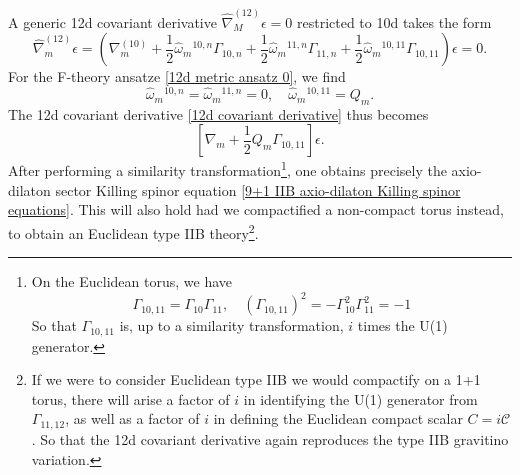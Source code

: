 {\color{orange}
    A generic 12d covariant derivative $\hat{\nabla}^{(12)}_M\epsilon = 0$ restricted to 10d takes the form
\begin{equation}
\hat{\nabla}^{(12)}_m\epsilon
=\left(
\nabla^{(10)}_m
+\frac{1}{2}\hat{\omega}_m{}^{10,n}\Gamma_{10,n}
+\frac{1}{2}\hat{\omega}_m{}^{11,n}\Gamma_{11,n}
+\frac{1}{2}\hat{\omega}_m{}^{10,11}\Gamma_{10,11}\right)\epsilon = 0.
\label{12d covariant derivative}
\end{equation}
    For the F-theory ansatze \eqref{12d metric ansatz 0}, we find
\begin{equation}
\hat{\omega}_m{}^{10,n}=\hat{\omega}_m{}^{11,n}=0,\quad
\hat{\omega}_m{}^{10,11} = Q_m.
\end{equation}
The 12d covariant derivative \eqref{12d covariant derivative} thus becomes
\begin{equation}
\left[
\nabla_m + \frac{1}{2}Q_m \Gamma_{10,11}
\right]\epsilon.
\end{equation}
}
After performing a similarity transformation\footnote{
On the Euclidean torus, we have
\begin{equation}
\Gamma_{10,11} = \Gamma_{10}\Gamma_{11},\quad
(\Gamma_{10,11})^2 
=-\Gamma_{10}^2\Gamma_{11}^2 = -1
\end{equation}
So that $\Gamma_{10,11}$ is, up to a similarity transformation, $i$ times the U(1) generator.
},
one obtains precisely the axio-dilaton sector Killing spinor equation \eqref{9+1 IIB axio-dilaton Killing spinor equations}.
This will also hold had we compactified a non-compact torus instead, to obtain an Euclidean type IIB theory\footnote{
If we were to consider Euclidean type IIB we would compactify on a 1+1 torus, there will arise a factor of $i$ in identifying the U(1) generator from $\Gamma_{11,12}$, as well as a factor of $i$ in defining the Euclidean compact scalar $C = i\mathcal C$. 
So that the 12d covariant derivative again reproduces the type IIB gravitino variation.
}.
